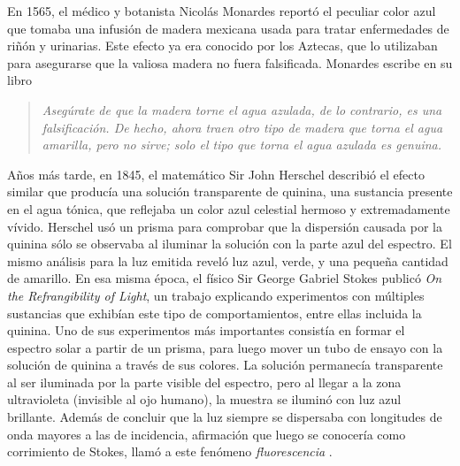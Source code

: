 \newpage


En 1565, el médico y botanista Nicolás Monardes reportó el peculiar color azul que tomaba una infusión de madera mexicana usada para tratar enfermedades de riñón y urinarias. Este efecto ya era conocido por los Aztecas, que lo utilizaban para asegurarse que la valiosa madera no fuera falsificada. Monardes escribe en su libro \cite{valeur_introduction_2012}

\begin{quote}
    \textit{Asegúrate de que la madera torne el agua azulada, de lo contrario, es una falsificación. De hecho, ahora traen otro tipo de madera que torna el agua amarilla, pero no sirve; solo el tipo que torna el agua azulada es genuina.}
\end{quote}  

\noindent Años más tarde, en 1845, el matemático Sir John Herschel describió el efecto similar que producía una solución transparente de quinina, una sustancia presente en el agua tónica, que reflejaba \flqq un color azul celestial hermoso y extremadamente vívido\frqq.
Herschel usó un prisma para comprobar que la dispersión causada por la quinina sólo se observaba al iluminar la solución con la parte azul del espectro.
El mismo análisis para la luz emitida reveló luz azul, verde, y una pequeña cantidad de amarillo.
En esa misma época, el físico Sir George Gabriel Stokes publicó \textit{On the Refrangibility of Light}, un trabajo explicando experimentos con múltiples sustancias que exhibían este tipo de comportamientos, entre ellas incluida la quinina.
Uno de sus experimentos más importantes consistía en formar el espectro solar a partir de un prisma, para luego mover un tubo de ensayo con la solución de quinina a través de sus colores.
La solución permanecía transparente al ser iluminada por la parte visible del espectro, pero al llegar a la zona ultravioleta (invisible al ojo humano), la muestra se iluminó con luz azul brillante.
Además de concluir que la luz siempre se dispersaba con longitudes de onda mayores a las de incidencia, afirmación que luego se conocería como corrimiento de Stokes, llamó a este fenómeno \textit{fluorescencia} \cite{valeur_introduction_2012}.


